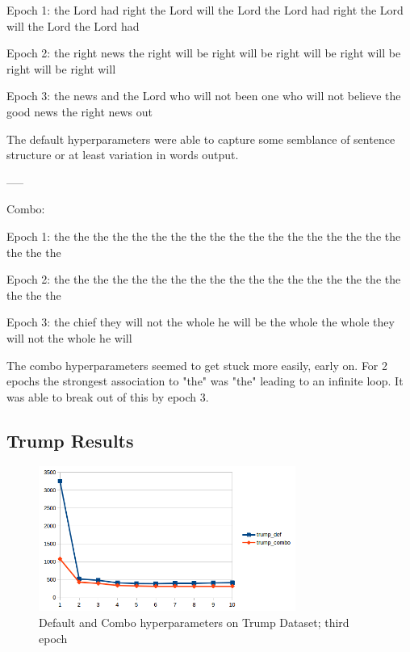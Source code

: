 \documentclass[10pt,a4paper]{article}
\begin{document}
Epoch 1: the Lord had right the Lord will the Lord the Lord had right the Lord will the Lord the Lord had

Epoch 2: the right news the right will be right will be right will be right will be right will be right will

Epoch 3: the news and the Lord who will not been one who will not believe the good news the right news out

The default hyperparameters were able to capture some semblance of sentence structure or at least variation in words output.

-----

Combo:


Epoch 1: the the the the the the the the the the the the the the the the the the the the the

Epoch 2: the the the the the the the the the the the the the the the the the the the the the

Epoch 3: the chief they will not the whole he will be the whole the whole they will not the whole he will

The combo hyperparameters seemed to get stuck more easily, early on. For 2 epochs the strongest association to "the" was "the" leading to an infinite loop. It was able to break out of this by epoch 3.

\subsection{Trump Results}

\begin{figure}[H]
  \begin{center}
    \includegraphics[width=0.75\textwidth] {trump1.png}
    \caption{Default and Combo hyperparameters on Trump Dataset; third epoch}
  \end{center}
\end{figure}
\end{document}
